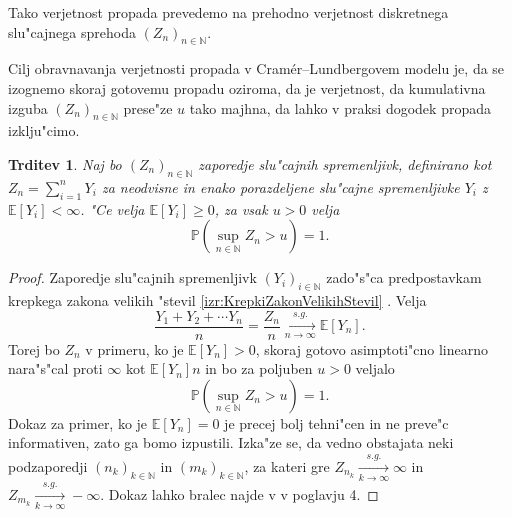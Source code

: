\documentclass[12pt, a4paper, reqno]{amsart}
\theoremstyle{definition}
\theoremstyle{plain}
\newtheorem{trditev}[definicija]{Trditev}
\newcommand{\N}{\mathbb{N}}
\newcommand{\E}{\mathbb{E}}
\newcommand{\Prob}{\mathbb{P}}
\newcommand{\1}{\mathds{1}}
\newcommand*{\refPriloga}[1]{%
  \begingroup
    \hypersetup{
      linkcolor=properpurple,
      linkbordercolor=properpurple,
    }%
    \ref{#1}%
  \endgroup
}
\begin{document}
        Tako verjetnost propada prevedemo na prehodno verjetnost diskretnega slu"cajnega 
        sprehoda $(Z_n)_{n\in\N}$.
        
        Cilj obravnavanja verjetnosti propada v 
        Cramér--Lundbergovem modelu je, da se izognemo skoraj gotovemu propadu oziroma, da je verjetnost, 
        da kumulativna izguba $(Z_n)_{n\in\N}$ prese"ze $u$
        tako majhna, da lahko v praksi dogodek propada izklju"cimo. 

        \begin{trditev}
            Naj bo $(Z_n)_{n\in\N}$ zaporedje slu"cajnih spremenljivk, definirano kot 
            $Z_n = \sum_{i=1}^nY_i$ za neodvisne in enako porazdeljene slu"cajne spremenljivke 
            $Y_i$ z $\E\left[Y_i\right] < \infty$. 
            "Ce velja $\E\left[Y_i\right] \geq 0$, za vsak $u>0$ velja
            \begin{equation*}
                \Prob\left(\sup_{n\in\N}Z_n > u\right) = 1.
            \end{equation*}
            \label{trd:propadZVerjetnostjo1}
        \end{trditev}

        \begin{proof}
            Zaporedje slu"cajnih spremenljivk $(Y_i)_{i\in\N}$ zado"s"ca predpostavkam krepkega zakona
            velikih "stevil \refPriloga{izr:KrepkiZakonVelikihStevil}. Velja
            \begin{equation*}
                \frac{Y_1 + Y_2 + \cdots Y_n}{n} = \frac{Z_n}{n} \xrightarrow[n\to\infty]{s.g.} \E\left[Y_n\right].
            \end{equation*}
            Torej bo $Z_n$ v primeru, ko je $\E\left[Y_n\right]>0$, 
             skoraj gotovo asimptoti"cno linearno nara"s"cal proti $\infty$ kot $\E\left[Y_n\right] n$ in 
             bo za poljuben $u>0$ veljalo 
            \begin{equation*}
                \Prob\left(\sup_{n\in\N}Z_n > u\right) = 1.
            \end{equation*}
            Dokaz za primer, ko je $\E\left[Y_n\right] = 0$ je precej bolj tehni"cen in ne preve"c informativen, zato 
            ga bomo izpustili. Izka"ze se, da vedno obstajata neki podzaporedji $(n_k)_{k\in\N}$ in $(m_k)_{k\in\N}$, 
            za kateri gre
            $Z_{n_k} \xrightarrow[k\to\infty]{s.g.}\infty$ in 
            $Z_{m_k} \xrightarrow[k\to\infty]{s.g.}-\infty$.
            Dokaz lahko bralec najde v \cite{6} v poglavju 4.
        \end{proof}
\end{document}
